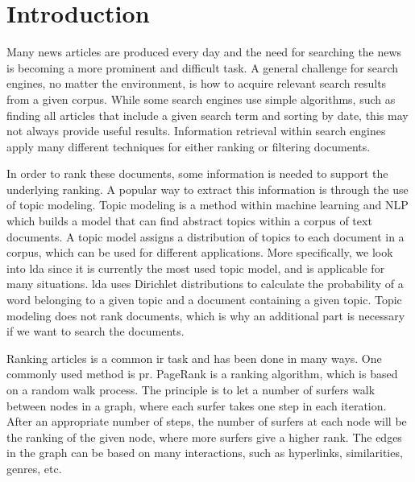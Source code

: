 \section{Introduction} 


Many news articles are produced every day and the need for searching the news is becoming a more prominent and difficult task.
A general challenge for search engines, no matter the environment, is how to acquire relevant search results from a given corpus. 
While some search engines use simple algorithms, such as finding all articles that include a given search term and sorting by date, this may not always provide useful results.
Information retrieval within search engines apply many different techniques for either ranking or filtering documents\cite{google_pagerank2006}.

In order to rank these documents, some information is needed to support the underlying ranking.
A popular way to extract this information is through the use of topic modeling.
Topic modeling is a method within machine learning and \gls{NLP} which builds a model that can find abstract topics within a corpus of text documents.
A topic model assigns a distribution of topics to each document in a corpus, which can be used for different applications.
More specifically, we look into \gls{lda} since it is currently the most used topic model, and is applicable for many situations\cite{lda}.
\gls{lda} uses Dirichlet distributions to calculate the probability of a word belonging to a given topic and a document containing a given topic.
Topic modeling does not rank documents, which is why an additional part is necessary if we want to search the documents.

Ranking articles is a common \gls{ir} task and has been done in many ways.
One commonly used method is \gls{pr}\cite{google_pagerank2006}.
PageRank\cite{pagerank_1999} is a ranking algorithm, which is based on a random walk process.
The principle is to let a number of surfers walk between nodes in a graph, where each surfer takes one step in each iteration.
After an appropriate number of steps, the number of surfers at each node will be the ranking of the given node, where more surfers give a higher rank.
The edges in the graph can be based on many interactions, such as hyperlinks, similarities, genres, etc.

